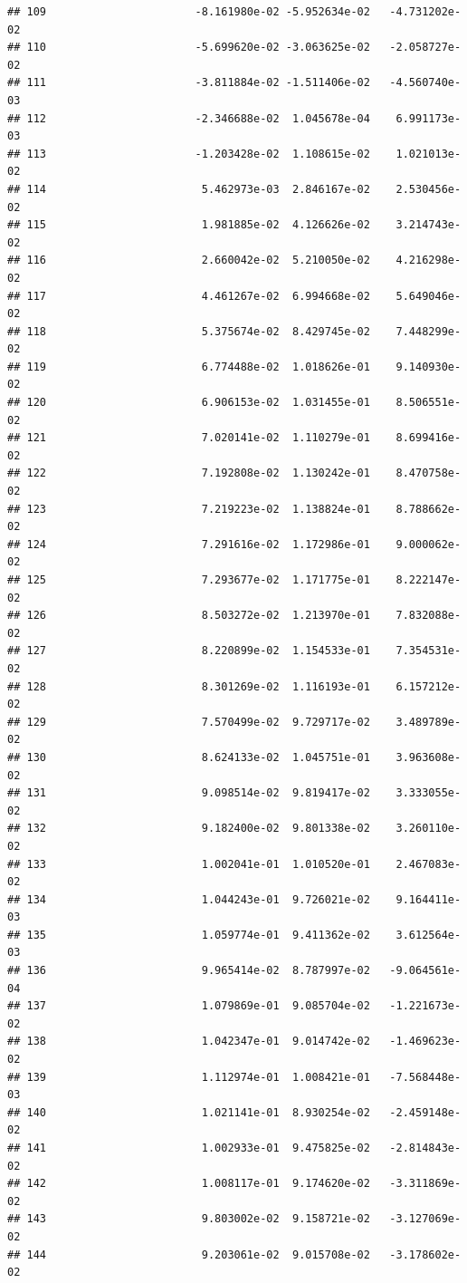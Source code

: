 \documentclass[
]{article}
\begin{document}
\begin{verbatim}
## 109                       -8.161980e-02 -5.952634e-02   -4.731202e-02
## 110                       -5.699620e-02 -3.063625e-02   -2.058727e-02
## 111                       -3.811884e-02 -1.511406e-02   -4.560740e-03
## 112                       -2.346688e-02  1.045678e-04    6.991173e-03
## 113                       -1.203428e-02  1.108615e-02    1.021013e-02
## 114                        5.462973e-03  2.846167e-02    2.530456e-02
## 115                        1.981885e-02  4.126626e-02    3.214743e-02
## 116                        2.660042e-02  5.210050e-02    4.216298e-02
## 117                        4.461267e-02  6.994668e-02    5.649046e-02
## 118                        5.375674e-02  8.429745e-02    7.448299e-02
## 119                        6.774488e-02  1.018626e-01    9.140930e-02
## 120                        6.906153e-02  1.031455e-01    8.506551e-02
## 121                        7.020141e-02  1.110279e-01    8.699416e-02
## 122                        7.192808e-02  1.130242e-01    8.470758e-02
## 123                        7.219223e-02  1.138824e-01    8.788662e-02
## 124                        7.291616e-02  1.172986e-01    9.000062e-02
## 125                        7.293677e-02  1.171775e-01    8.222147e-02
## 126                        8.503272e-02  1.213970e-01    7.832088e-02
## 127                        8.220899e-02  1.154533e-01    7.354531e-02
## 128                        8.301269e-02  1.116193e-01    6.157212e-02
## 129                        7.570499e-02  9.729717e-02    3.489789e-02
## 130                        8.624133e-02  1.045751e-01    3.963608e-02
## 131                        9.098514e-02  9.819417e-02    3.333055e-02
## 132                        9.182400e-02  9.801338e-02    3.260110e-02
## 133                        1.002041e-01  1.010520e-01    2.467083e-02
## 134                        1.044243e-01  9.726021e-02    9.164411e-03
## 135                        1.059774e-01  9.411362e-02    3.612564e-03
## 136                        9.965414e-02  8.787997e-02   -9.064561e-04
## 137                        1.079869e-01  9.085704e-02   -1.221673e-02
## 138                        1.042347e-01  9.014742e-02   -1.469623e-02
## 139                        1.112974e-01  1.008421e-01   -7.568448e-03
## 140                        1.021141e-01  8.930254e-02   -2.459148e-02
## 141                        1.002933e-01  9.475825e-02   -2.814843e-02
## 142                        1.008117e-01  9.174620e-02   -3.311869e-02
## 143                        9.803002e-02  9.158721e-02   -3.127069e-02
## 144                        9.203061e-02  9.015708e-02   -3.178602e-02

\end{verbatim}
\end{document}

